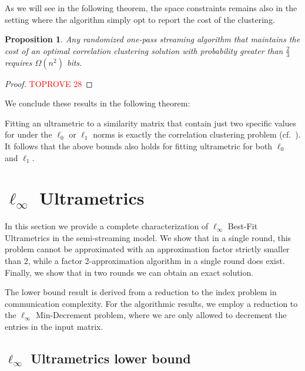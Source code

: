 \documentclass{article}
\newtheorem{proposition}[theorem]{Proposition}
\begin{document}
As we will see in the following theorem, the space constraints remains also in the setting where the algorithm simply opt to report the cost of the clustering.

\begin{proposition}\label{proposition:lbzeroscore}
    Any randomized one-pass streaming algorithm that maintains the cost of an optimal correlation clustering solution with probability greater than $\frac{2}{3}$ requires $\Omega(n^2)$ bits.
\end{proposition}

\begin{proof}\textcolor{red}{TOPROVE 28}\end{proof}

We conclude these results in the following theorem:

\lbzeroclusteringorscore*

Fitting an ultrametric to a similarity matrix that contain just two specific values for under the $\ell_0$ or $\ell_1$ norms is exactly the correlation clustering problem (cf.~\cite{charikar}). It follows that the above bounds also holds for fitting ultrametric for both $\ell_0$ and $\ell_1$.

\lbzeroultrametric*


\section{\texorpdfstring{$\ell_\infty$ Ultrametrics}{l-inf Ultrametrics}} \label{section:linf}

In this section we provide a complete characterization of $\ell_\infty$ Best-Fit Ultrametrics in the semi-streaming model.
We show that in a single round, this problem cannot be approximated with an approximation factor strictly smaller than 2, while a factor 2-approximation algorithm in a single round does exist. Finally, we show that in two rounds we can obtain an exact solution. 

The lower bound result is derived from a reduction to the index problem in communication complexity. For the algorithmic results, we employ a reduction to the $\ell_\infty$ Min-Decrement problem, where we are only allowed to decrement the entries in the input matrix.

\subsection{\texorpdfstring{$\ell_\infty$ Ultrametrics lower bound}{l-inf Ultrametrics lower bound}}
\end{document}
